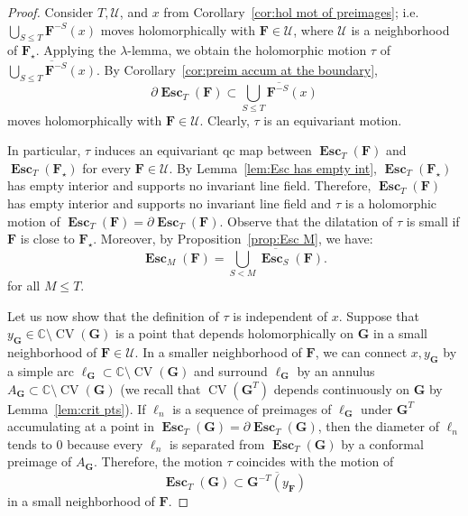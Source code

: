 \documentclass{amsart}
\newcommand{\1}{{\mathbb 1 }}
\newcommand{\bF}{{\mathbf F}}
\newcommand{\bG}{{\mathbf G}}
\newcommand{\str}{{\star}}
\newcommand\bUU{{ \boldsymbol{\mathcal U}}}
\newcommand{\C}{\mathbb{C}}
\theoremstyle{remark}
\numberwithin{equation}{section}
\theoremstyle{definition}
\newcommand{\Esc}{{\boldsymbol{\operatorname{Esc}}}}
\newcommand{\CV}{{\operatorname{CV}}}
\theoremstyle{nonumberbreak}
\begin{document}
\begin{proof}

Consider $T,\bUU$, and $x$ from Corollary~\ref{cor:hol mot of preimages}; i.e.~$\displaystyle{ {\bigcup_{S\le T}\bF^{-S}(x)}}$ moves holomorphically with $\bF\in \bUU$, where $\bUU$ is a neighborhood of $\bF_\str$. Applying the $\lambda$-lemma, we obtain the holomorphic motion $\tau$ of $\displaystyle{ \overline{\bigcup_{S\le T}\bF^{-S}(x)}}$. By Corollary~\ref{cor:preim accum at the boundary}, 
\begin{equation}
\label{eq:prf:eq:lem:esc set moves hol}
\partial \Esc_T(\bF)\subset { \overline{\bigcup_{S\le T}\bF^{-S}(x)}}
\end{equation}
 moves holomorphically with $\bF\in \bUU$. Clearly, $\tau$ is an equivariant motion. 
 
 In particular, $\tau$ induces an equivariant qc map between $\Esc_T(\bF)$ and $\Esc_{T}(\bF_\str)$ for every $\bF\in \bUU$. By Lemma~\ref{lem:Esc has empty int}, $\Esc_T(\bF_\str)$ has empty interior and supports no invariant line field. Therefore, $\Esc_T(\bF)$ has empty interior and supports no invariant line field and $\tau$ is a holomorphic motion of $\Esc_T(\bF)=\partial \Esc_T(\bF)$. Observe that the dilatation of $\tau$ is small if $\bF$ is close to $\bF_\str$. Moreover, by Proposition~\ref{prop:Esc M}, we have:
\begin{equation}
\label{eq:Esc M is: cup Esc S}
 \Esc_M(\bF)=\overline{\bigcup_{S<M} \Esc_S(\bF)}.
\end{equation}
for all $M\le T$.
 
 
 



Let us now show that the definition of $\tau$ is independent of $x$. Suppose that $y_{\bG}\in \C\setminus \CV(\bG)$ is a point that depends holomorphically on $\bG$ in a small neighborhood of $\bF\in \bUU$. In a smaller neighborhood of $\bF$, we can connect $x,y_\bG$ by a simple arc $\ell_\bG\subset \C\setminus \CV(\bG)$ and surround $\ell_\bG$ by an annulus $A_\bG\subset \C\setminus \CV(\bG)$ (we recall that $\CV(\bG^T)$ depends continuously on $\bG$ by Lemma~\ref{lem:crit pts}). If $\ell_n$ is a sequence of preimages of $\ell_\bG$ under $\bG^{T}$ accumulating at a point in $\Esc_T(\bG)=\partial \Esc_T(\bG)$, then the diameter of $\ell_n$ tends to $0$ because every $\ell_n$ is separated from $\Esc_T(\bG)$ by a conformal preimage of $A_\bG$. Therefore, the motion $\tau$ coincides with the motion of 
\[ \Esc_T(\bG)\subset \overline {\bG^{-T}(y_{\bF})}\] in a small neighborhood of $\bF$. 




\end{proof}
\end{document}
